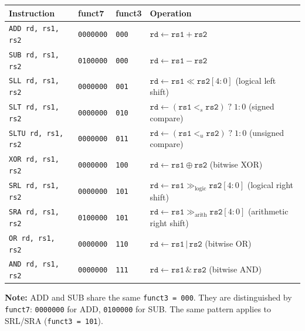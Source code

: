 \documentclass[12pt, a4paper, oneside]{book}
\begin{document}
\begin{center}
\renewcommand{\arraystretch}{1.25}
\begin{tabular}{l l l p{7.5cm}}
\toprule
\textbf{\color{purple}Instruction} & \textbf{\color{purple}funct7} & \textbf{\color{purple}funct3} & \textbf{\color{purple}Operation} \\
\midrule
\texttt{ADD  rd, rs1, rs2}  & \texttt{0000000} & \texttt{000} & $\texttt{rd} \leftarrow \texttt{rs1} + \texttt{rs2}$ \\
\texttt{SUB  rd, rs1, rs2}  & \texttt{0100000} & \texttt{000} & $\texttt{rd} \leftarrow \texttt{rs1} - \texttt{rs2}$ \\
\texttt{SLL  rd, rs1, rs2}  & \texttt{0000000} & \texttt{001} & $\texttt{rd} \leftarrow \texttt{rs1} \ll \texttt{rs2}[4:0]$ (logical left shift) \\
\texttt{SLT  rd, rs1, rs2}  & \texttt{0000000} & \texttt{010} & $\texttt{rd} \leftarrow (\texttt{rs1} <_s \texttt{rs2})\;?\;1:0$ (signed compare) \\
\texttt{SLTU rd, rs1, rs2}  & \texttt{0000000} & \texttt{011} & $\texttt{rd} \leftarrow (\texttt{rs1} <_u \texttt{rs2})\;?\;1:0$ (unsigned compare) \\
\texttt{XOR  rd, rs1, rs2}  & \texttt{0000000} & \texttt{100} & $\texttt{rd} \leftarrow \texttt{rs1} \oplus \texttt{rs2}$ (bitwise XOR) \\
\texttt{SRL  rd, rs1, rs2}  & \texttt{0000000} & \texttt{101} & $\texttt{rd} \leftarrow \texttt{rs1} \gg_\text{logic} \texttt{rs2}[4:0]$ (logical right shift) \\
\texttt{SRA  rd, rs1, rs2}  & \texttt{0100000} & \texttt{101} & $\texttt{rd} \leftarrow \texttt{rs1} \gg_\text{arith} \texttt{rs2}[4:0]$ (arithmetic right shift) \\
\texttt{OR   rd, rs1, rs2}  & \texttt{0000000} & \texttt{110} & $\texttt{rd} \leftarrow \texttt{rs1} \,|\, \texttt{rs2}$ (bitwise OR) \\
\texttt{AND  rd, rs1, rs2}  & \texttt{0000000} & \texttt{111} & $\texttt{rd} \leftarrow \texttt{rs1} \,\&\, \texttt{rs2}$ (bitwise AND) \\
\bottomrule
\end{tabular}
\end{center}

\begin{infobox}
\textbf{\color{accentblue}Note:} ADD and SUB share the same \texttt{funct3 = 000}. They are distinguished by \texttt{funct7}: \texttt{0000000} for ADD, \texttt{0100000} for SUB. The same pattern applies to SRL/SRA (\texttt{funct3 = 101}).
\end{infobox}
\end{document}
